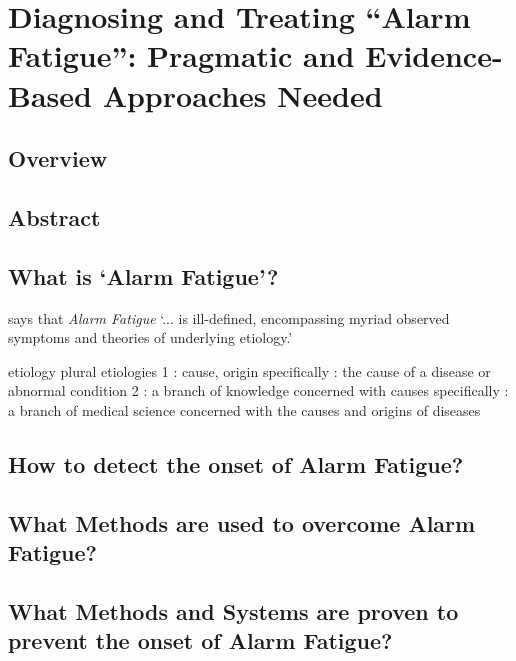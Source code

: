 \chapter{Diagnosing and Treating “Alarm Fatigue”: Pragmatic and
	Evidence-Based Approaches Needed}

\section{Overview}

\section{Abstract}

\section{What is `Alarm Fatigue'?}

\citet[p.291]{rayo2016diagnosing} says that \textit{Alarm Fatigue} `... is ill-defined, encompassing myriad observed symptoms and theories of underlying etiology.'


etiology
plural etiologies
1 : cause, origin
specifically : the cause of a disease or abnormal condition
2 : a branch of knowledge concerned with causes
specifically : a branch of medical science concerned with the causes and origins of diseases


\section{How to detect the onset of Alarm Fatigue?}

\section{What Methods are used to overcome Alarm Fatigue?}

\section{What Methods and Systems are proven to prevent the onset of Alarm Fatigue?}
